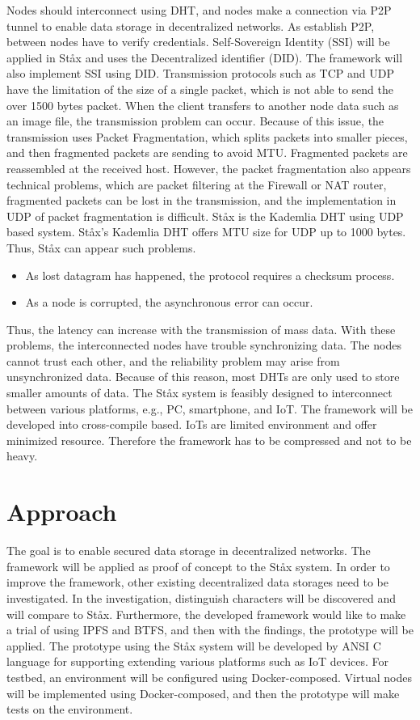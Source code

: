 Nodes should interconnect using DHT, and nodes make a connection via P2P tunnel to enable data storage in decentralized networks. As establish P2P, between nodes have to verify credentials. Self-Sovereign Identity (SSI) will be applied in St\aa x and uses the Decentralized identifier (DID). The framework will also implement SSI using DID. Transmission protocols such as TCP and UDP have the limitation of the size of a single packet, which is not able to send the over 1500 bytes packet. When the client transfers to another node data such as an image file, the transmission problem can occur. Because of this issue, the transmission uses Packet Fragmentation, which splits packets into smaller pieces, and then fragmented packets are sending to avoid MTU. Fragmented packets are reassembled at the received host. However, the packet fragmentation also appears technical problems, which are packet filtering at the Firewall or NAT router, fragmented packets can be lost in the transmission, and the implementation in UDP of packet fragmentation is difficult. St\aa x is the Kademlia DHT using UDP based system. St\aa x's Kademlia DHT offers MTU size for UDP up to 1000 bytes. Thus, St\aa x can appear such problems.
\begin{itemize}
	\item As lost datagram has happened, the protocol requires a checksum process.
	\item As a node is corrupted, the asynchronous error can occur.
\end{itemize}
Thus, the latency can increase with the transmission of mass data. With these problems, the interconnected nodes have trouble synchronizing data. The nodes cannot trust each other, and the reliability problem may arise from unsynchronized data. Because of this reason, most DHTs are only used to store smaller amounts of data. The St\aa x system is feasibly designed to interconnect between various platforms, e.g., PC, smartphone, and IoT. The framework will be developed into cross-compile based. IoTs are limited environment and offer minimized resource. Therefore the framework has to be compressed and not to be heavy.

\section{Approach}

The goal is to enable secured data storage in decentralized networks. The framework will be applied as proof of concept to the St\aa x system. In order to improve the framework, other existing decentralized data storages need to be investigated. In the investigation, distinguish characters will be discovered and will compare to St\aa x. Furthermore, the developed framework would like to make a trial of using IPFS and BTFS, and then with the findings, the prototype will be applied. The prototype using the St\aa x system will be developed by ANSI C language for supporting extending various platforms such as IoT devices. For testbed, an environment will be configured using Docker-composed. Virtual nodes will be implemented using Docker-composed, and then the prototype will make tests on the environment.

